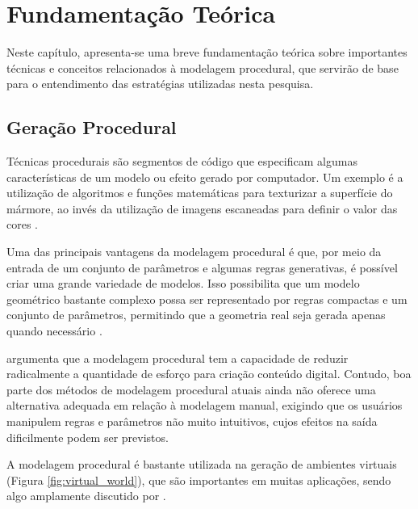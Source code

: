 \chapter{Fundamentação Teórica}
\label{cap:fundamentacao-teorica}

Neste capítulo, apresenta-se uma breve fundamentação teórica sobre importantes técnicas e conceitos relacionados à modelagem procedural, que servirão de base para o entendimento das estratégias utilizadas nesta pesquisa.

\section{Geração Procedural}
\label{sec:geracao_procedural}

Técnicas procedurais são segmentos de código que especificam algumas características de um modelo ou efeito gerado por computador. Um exemplo é a utilização de algoritmos e funções matemáticas para texturizar a superfície do mármore, ao invés da utilização de imagens escaneadas para definir o valor das cores \cite{ebert2002}.

Uma das principais vantagens da modelagem procedural é que, por meio da entrada de um conjunto de parâmetros e algumas regras generativas, é possível criar uma grande variedade de modelos. Isso possibilita que um modelo geométrico bastante complexo possa ser representado por regras compactas e um conjunto de parâmetros, permitindo que a geometria real seja gerada apenas quando necessário \cite{smelik2014}.

 argumenta que a modelagem procedural tem a capacidade de reduzir radicalmente a quantidade de esforço para criação conteúdo digital. Contudo, boa parte dos métodos de modelagem procedural atuais ainda não oferece uma alternativa adequada em relação à modelagem manual, exigindo que os usuários manipulem regras e parâmetros não muito intuitivos, cujos efeitos na saída dificilmente podem ser previstos.

A modelagem procedural é bastante utilizada na geração de ambientes virtuais (Figura \ref{fig:virtual_world}), que são importantes em muitas aplicações, sendo algo amplamente discutido por .

\begin{figure}[h!]
	\centering
	\captionsetup{width=15cm}
	{}	
\end{figure}

